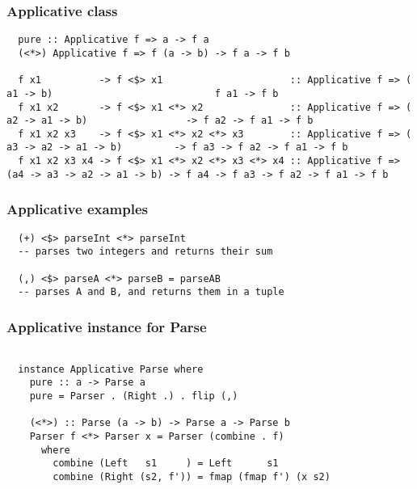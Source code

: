 \documentclass{beamer}
\begin{document}


\begin{frame}
  \frametitle{Applicative class}

  \begin{lstlisting}
  pure :: Applicative f => a -> f a
  (<*>) Applicative f => f (a -> b) -> f a -> f b

  f x1          -> f <$> x1                      :: Applicative f => (                  a1 -> b)                            f a1 -> f b
  f x1 x2       -> f <$> x1 <*> x2               :: Applicative f => (            a2 -> a1 -> b)                 -> f a2 -> f a1 -> f b
  f x1 x2 x3    -> f <$> x1 <*> x2 <*> x3        :: Applicative f => (      a3 -> a2 -> a1 -> b)         -> f a3 -> f a2 -> f a1 -> f b
  f x1 x2 x3 x4 -> f <$> x1 <*> x2 <*> x3 <*> x4 :: Applicative f => (a4 -> a3 -> a2 -> a1 -> b) -> f a4 -> f a3 -> f a2 -> f a1 -> f b
  \end{lstlisting}

\end{frame}


\begin{frame}
  \frametitle{Applicative examples}

  \begin{lstlisting}
  (+) <$> parseInt <*> parseInt
  -- parses two integers and returns their sum

  (,) <$> parseA <*> parseB = parseAB
  -- parses A and B, and returns them in a tuple
  \end{lstlisting}

\end{frame}


%
%
%


\begin{frame}
  \frametitle{Applicative instance for Parse}

  \begin{lstlisting}

  instance Applicative Parse where
    pure :: a -> Parse a
    pure = Parser . (Right .) . flip (,)

    (<*>) :: Parse (a -> b) -> Parse a -> Parse b
    Parser f <*> Parser x = Parser (combine . f)
      where
        combine (Left   s1     ) = Left      s1
        combine (Right (s2, f')) = fmap (fmap f') (x s2)

  \end{lstlisting}

\end{frame}
\end{document}

